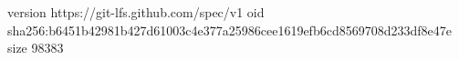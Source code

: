 version https://git-lfs.github.com/spec/v1
oid sha256:b6451b42981b427d61003c4e377a25986cee1619efb6cd8569708d233df8e47e
size 98383
